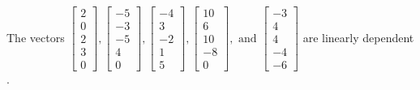 \begin{exercise}
\begin{exerciseStatement}
  \end{exerciseStatement}
  \begin{exerciseAnswer}
   The vectors \(\left[\begin{array}{r}
2 \\
0 \\
2 \\
3 \\
0
\end{array}\right] , \left[\begin{array}{r}
-5 \\
-3 \\
-5 \\
4 \\
0
\end{array}\right] , \left[\begin{array}{r}
-4 \\
3 \\
-2 \\
1 \\
5
\end{array}\right] , \left[\begin{array}{r}
10 \\
6 \\
10 \\
-8 \\
0
\end{array}\right] , \text{ and } \left[\begin{array}{r}
-3 \\
4 \\
4 \\
-4 \\
-6
\end{array}\right]\) are 
  	 linearly dependent  .
  


  \end{exerciseAnswer}
\end{exercise}